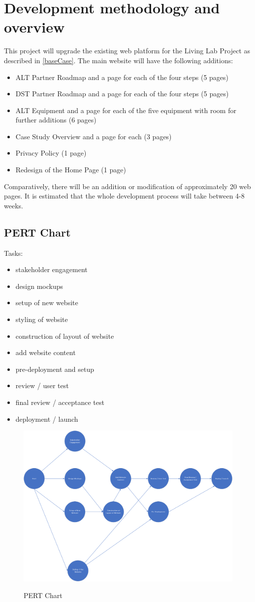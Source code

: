 \section{Development methodology and overview}

This project will upgrade the existing web platform for the Living Lab Project as described in \ref{baseCase}. The main website will have the following additions:
\begin{itemize}
    \item ALT Partner Roadmap and a page for each of the four steps (5 pages)
    \item DST Partner Roadmap and a page for each of the four steps (5 pages)
    \item ALT Equipment and a page for each of the five equipment with room for further additions (6 pages)
    \item Case Study Overview and a page for each (3 pages)
    \item Privacy Policy (1 page)
    \item Redesign of the Home Page (1 page)
\end{itemize}
Comparatively, there will be an addition or modification of approximately 20 web pages. It is estimated that the whole development process will take between 4-8 weeks.

\subsection{PERT Chart}
Tasks:
\begin{itemize}
 \item stakeholder engagement
 \item design mockups
 \item setup of new website
 \item styling of website
 \item construction of layout of website
 \item add website content
 \item pre-deployment and setup
 \item review / user test
 \item final review / acceptance test
 \item deployment / launch
\end{itemize}

\begin{figure}
\begin{center}
  \includegraphics[width=\textwidth]{DevelopmentMethodologyAndOverview/PERT.png} \\
  \caption{PERT Chart} \label{PERTChart}
\end{center}
\end{figure}